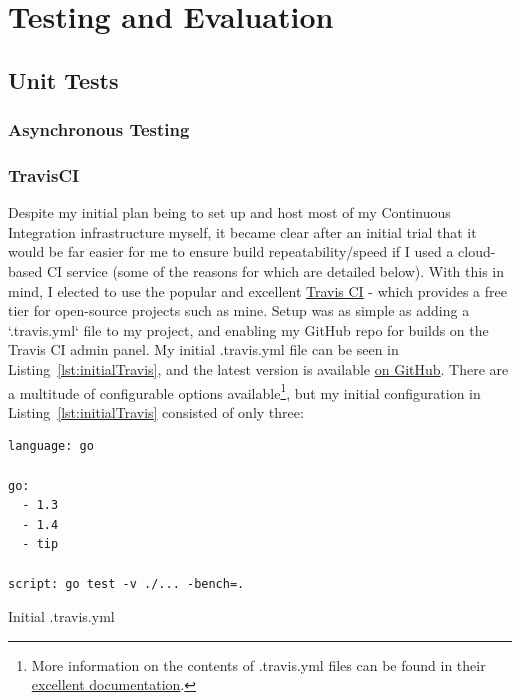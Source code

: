 \chapter{Testing and Evaluation}
\label{chap:Testing and Evaluation}

\section{Unit Tests}
\label{sec:Unit Tests}


\subsection{Asynchronous Testing}
\label{sub:Asynchronous Testing}


\subsection{TravisCI}
\label{sub:TravisCI}


Despite my initial plan being to set up and host most of my Continuous
Integration infrastructure myself, it became clear after an initial trial that
it would be far easier for me to ensure build repeatability/speed if I used a
cloud-based CI service (some of the reasons for which are detailed below). With
this in mind, I elected to use the popular and excellent
\href{https://travis-ci.org/}{Travis CI} - which provides a free tier for
open-source projects such as mine. Setup was as simple as adding a `.travis.yml`
file to my project, and enabling my GitHub repo for builds on the Travis CI
admin panel. My initial .travis.yml file can be seen in
Listing~\ref{lst:initialTravis}, and the latest version is available
\href{https://github.com/FireEater64/gamq/blob/master/.travis.yml}{on GitHub}.
There are a multitude of configurable options available\footnote{More
information on the contents of .travis.yml files can be found in their
\href{https://docs.travis-ci.com/}{excellent documentation}.}, but my initial
configuration in Listing~\ref{lst:initialTravis} consisted of only three:

\begin{listing}
  \centering
  \begin{verbatim}
language: go

go:
  - 1.3
  - 1.4
  - tip

script: go test -v ./... -bench=.
  \end{verbatim}
  \caption{Initial .travis.yml}
  \label{lst:initialTravis}
\end{listing}

